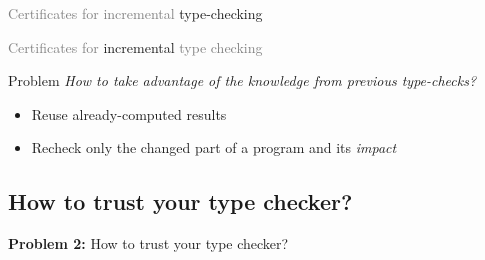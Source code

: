 \begin{frame}{\textcolor{gray}{Certificates for incremental}
    type-checking}
\begin{center}
  \end{center}
\end{frame}


\begin{frame}{\textcolor{gray}{Certificates for} incremental
    \textcolor{gray}{type checking}}

    \begin{block}{Problem}
      \emph{How to take advantage of the knowledge from previous type-checks?}
      \begin{itemize}
      \item Reuse already-computed results
      \item Recheck only the changed part of a program and its
        \emph{impact}
      \end{itemize}
    \end{block}
\end{frame}

\subsection{How to trust your type checker?}

\begin{frame}
  \begin{center}
    \large
    {\bf Problem 2:}
    How to trust your type checker?
  \end{center}
\end{frame}

